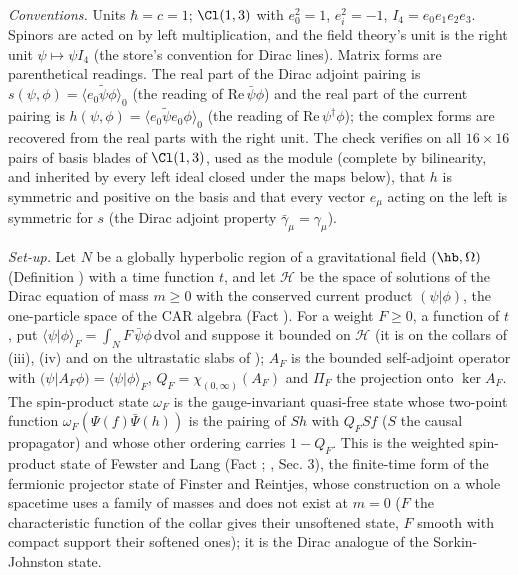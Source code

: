 \emph{Conventions.} Units $\hbar = c = 1$; $\Cl(1,3)$ with $e_{0}^{2} = 1$, $e_{i}^{2} = -1$, $I_{4} = e_{0}e_{1}e_{2}e_{3}$. Spinors are acted on by left multiplication, and the field theory's unit is the right unit $\psi \mapsto \psi I_{4}$ (the store's convention for Dirac lines). Matrix forms are parenthetical readings. The real part of the Dirac adjoint pairing is $s(\psi, \phi) = \langle e_{0}\tilde\psi\phi\rangle_{0}$ (the reading of $\mathrm{Re}\,\bar\psi\phi$) and the real part of the current pairing is $h(\psi, \phi) = \langle e_{0}\tilde\psi e_{0}\phi\rangle_{0}$ (the reading of $\mathrm{Re}\,\psi^{\dagger}\phi$); the complex forms are recovered from the real parts with the right unit. The check verifies on all $16 \times 16$ pairs of basis blades of $\Cl(1,3)$, used as the module (complete by bilinearity, and inherited by every left ideal closed under the maps below), that $h$ is symmetric and positive on the basis and that every vector $e_{\mu}$ acting on the left is symmetric for $s$ (the Dirac adjoint property $\bar\gamma_{\mu} = \gamma_{\mu}$).

\emph{Set-up.} Let $N$ be a globally hyperbolic region of a gravitational field $(\hb, \Omega)$ (Definition ) with a time function $t$, and let $\mathcal{H}$ be the space of solutions of the Dirac equation of mass $m \ge 0$ with the conserved current product $(\psi|\phi)$, the one-particle space of the CAR algebra (Fact ). For a weight $F \ge 0$, a function of $t$, put $\langle\psi|\phi\rangle_{F} = \int_{N}F\,\bar\psi\phi\,\mathrm{dvol}$ and suppose it bounded on $\mathcal{H}$ (it is on the collars of (iii), (iv) and on the ultrastatic slabs of \cite{FewsterLang2015}); $A_{F}$ is the bounded self-adjoint operator with $(\psi|A_{F}\phi) = \langle\psi|\phi\rangle_{F}$, $Q_{F} = \chi_{(0,\infty)}(A_{F})$ and $\Pi_{F}$ the projection onto $\ker A_{F}$. The spin-product state $\omega_{F}$ is the gauge-invariant quasi-free state whose two-point function $\omega_{F}(\Psi(f)\bar\Psi(h))$ is the pairing of $Sh$ with $Q_{F}Sf$ ($S$ the causal propagator) and whose other ordering carries $1 - Q_{F}$. This is the weighted spin-product state of Fewster and Lang (Fact ; \cite{FewsterLang2015}, Sec. 3), the finite-time form of the fermionic projector state of Finster and Reintjes, whose construction on a whole spacetime uses a family of masses and does not exist at $m = 0$ ($F$ the characteristic function of the collar gives their unsoftened state, $F$ smooth with compact support their softened ones); it is the Dirac analogue of the Sorkin-Johnston state.

